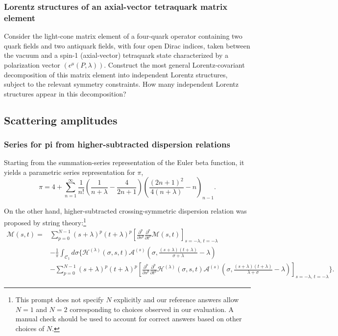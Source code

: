 \subsubsection{Lorentz structures of an axial-vector tetraquark matrix element}
\label{problem:tetraquark-lorentz-structures}
Consider the light-cone matrix element of a four-quark operator containing two quark fields and two antiquark fields, with four open Dirac indices, taken between the vacuum and a spin-1 (axial-vector) tetraquark state characterized by a polarization vector $(\epsilon^\mu(P,\lambda))$. Construct the most general Lorentz-covariant decomposition of this matrix element into independent Lorentz structures, subject to the relevant symmetry constraints. How many independent Lorentz structures appear in this decomposition?

\subsection{Scattering amplitudes}
\label{problems:scattering}

\subsubsection{Series for pi from higher-subtracted dispersion relations}
\label{problem:dispersion-pi-series}
Starting from the summation-series representation of the Euler beta function, it yields a parametric series representation for $\pi$,
\begin{equation}
\pi
=
4
+
\sum_{n=1}^{\infty}
\frac{1}{n!}
\left(
\frac{1}{n+\lambda}
-
\frac{4}{2n+1}
\right)
\left(
\frac{(2n+1)^2}{4(n+\lambda)}
-
n
\right)_{n-1}.
\end{equation}

On the other hand, higher-subtracted crossing-symmetric dispersion relation was proposed by string theory:\footnote{This prompt does not specify $N$  explicitly and our reference answers allow $N=1$ and $N=2$ corresponding to choices observed in our evaluation. A manual check should be used to account for correct answers based on other choices of $N$.}
\begin{align}
\mathcal{M}(s,t)
={}&
\sum_{p=0}^{N-1}
(s+\lambda)^p (t+\lambda)^p
\left[
\frac{\partial^p}{\partial s^p}
\frac{\partial^p}{\partial t^p}
\mathcal{M}(s,t)
\right]_{s=-\lambda,\,t=-\lambda}
\nonumber\\
&-
\frac{1}{\pi}
\int_{\mathcal{C}_1} d\sigma
\Bigg\{
\mathcal{H}^{(\lambda)}(\sigma,s,t)
\mathcal{A}^{(s)}
\left(
\sigma,
\frac{(s+\lambda)(t+\lambda)}{\sigma+\lambda}
-\lambda
\right)
\nonumber\\
&
-
\sum_{p=0}^{N-1}
(s+\lambda)^p (t+\lambda)^p
\left[
\frac{\partial^p}{\partial s^p}
\frac{\partial^p}{\partial t^p}
\mathcal{H}^{(\lambda)}(\sigma,s,t)
\mathcal{A}^{(s)}
\left(
\sigma,
\frac{(s+\lambda)(t+\lambda)}{\lambda+\sigma}
-\lambda
\right)
\right]_{s=-\lambda,\,t=-\lambda}
\Bigg\}.
\end{align}

